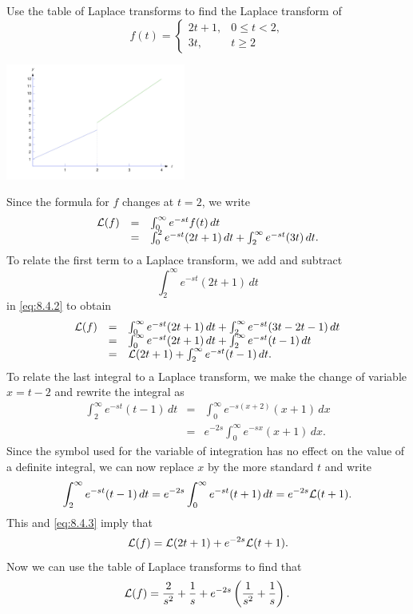 \documentclass{ximera}
\begin{document}
\begin{example}\label{example:8.4.1}
 Use the table of Laplace transforms to find the Laplace
transform of
\begin{equation} \label{eq:8.4.1}
f(t)=\left\{\begin{array}{cl}
2t+1,&0\leq t<2,\\
 3t,&t\geq 2
\end{array}\right.
\end{equation}
\begin{image}
 \includegraphics[height=1.5in]{fig080401.jpg}
 \end{image}

\begin{explanation}
Since the formula for $f$ changes at $t=2$, we write
\begin{equation}\label{eq:8.4.2}
\begin{array}{ccl}
{\cal L}(f)&=&\int_0^\infty e^{-st}f(t)\,dt\\
&=&\int_0^2 e^{-st}(2t+1)\,dt+\int_2^\infty e^{-st}(3t)\,dt.
\end{array}
\end{equation}
To relate the first term to a Laplace transform,  we add and subtract
$$
\int_2^\infty e^{-st}(2t+1)\,dt
$$
in \eqref{eq:8.4.2} to obtain
\begin{equation}\label{eq:8.4.3}
\begin{array}{ccl}
{\cal L}(f)&=&\int_0^\infty e^{-st}(2t+1)\,dt+
\int_2^\infty e^{-st}(3t-2t-1)\,dt\\
&=&\int_0^\infty e^{-st}(2t+1)\,dt+
\int_2^\infty e^{-st}(t-1)\,dt\\
&=&{\cal L}(2t+1)+\int_2^\infty e^{-st}(t-1)\,dt.
\end{array}
\end{equation}
To relate the last integral to a Laplace transform,
  we make the change of variable
 $x=t-2$ and rewrite the integral as
\begin{eqnarray*}
\int_2^\infty e^{-st}(t-1)\,dt&=&\int_0^\infty e^{-s(x+2)}(x+1)\,dx
\\
&=&e^{-2s}\int_0^\infty e^{-sx}(x+1)\,dx.
\end{eqnarray*}
Since the symbol used for the variable of integration has no effect on the
value of a definite integral, we can now replace $x$ by the more standard
$t$ and write
$$
\int_2^\infty e^{-st}(t-1)\,dt
=e^{-2s}\int_0^\infty e^{-st}(t+1)\,dt=e^{-2s}{\cal L}(t+1).
$$
This and \eqref{eq:8.4.3} imply that
$$
{\cal L}(f)={\cal L}(2t+1)+e^{-2s}{\cal L} (t+1).
$$
Now we can use the table of Laplace transforms to find that
$$
{\cal L}(f)=\frac{2}{s^2}+\frac{1}{s} +e^{-2s}\left(\frac{1}{s^2}+\frac{1}{s}\right).
$$
\end{explanation}
\end{example}
\end{document}
